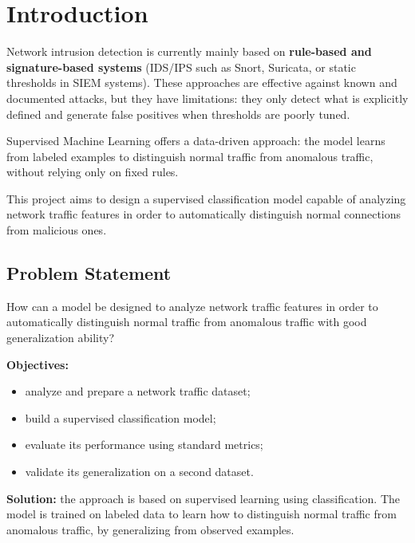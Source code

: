 \chapter*{Introduction}

Network intrusion detection is currently mainly based on \textbf{rule-based and signature-based systems} (IDS/IPS such as Snort, Suricata, or static thresholds in SIEM systems). These approaches are effective against known and documented attacks, but they have limitations: they only detect what is explicitly defined and generate false positives when thresholds are poorly tuned.

Supervised Machine Learning offers a data-driven approach: the model learns from labeled examples to distinguish normal traffic from anomalous traffic, without relying only on fixed rules.

This project aims to design a supervised classification model capable of analyzing network traffic features in order to automatically distinguish normal connections from malicious ones.

\section*{Problem Statement}

How can a model be designed to analyze network traffic features in order to automatically distinguish normal traffic from anomalous traffic with good generalization ability?

\textbf{Objectives:}
\begin{itemize}[leftmargin=*,itemsep=2pt]
    \item analyze and prepare a network traffic dataset;
    \item build a supervised classification model;
    \item evaluate its performance using standard metrics;
    \item validate its generalization on a second dataset.
\end{itemize}

\textbf{Solution:} the approach is based on supervised learning using classification. The model is trained on labeled data to learn how to distinguish normal traffic from anomalous traffic, by generalizing from observed examples.